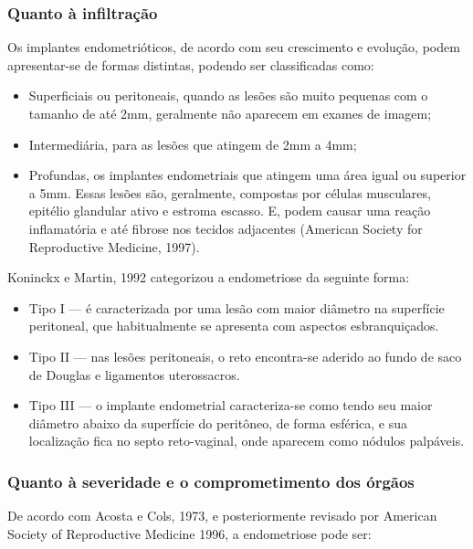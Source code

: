 \documentclass[12pt]{article} %
\begin{document}
\subsubsection{Quanto à infiltração}

Os implantes endometrióticos, de acordo com seu crescimento e evolução,
podem apresentar-se de formas distintas, podendo ser classificadas
como:
\begin{itemize}

\item Superficiais ou peritoneais, quando as lesões são muito pequenas
com o tamanho de até 2mm, geralmente não aparecem em exames de imagem;
\item Intermediária, para as lesões que atingem de 2mm a 4mm; 
\item Profundas, os implantes endometriais que atingem uma área igual ou superior a 5mm.
Essas lesões são, geralmente, compostas por células musculares,
epitélio glandular ativo e estroma escasso. E, podem causar uma reação
inflamatória e até fibrose nos tecidos adjacentes (American Society
for Reproductive Medicine, 1997).
\end{itemize}

Koninckx e Martin, 1992 categorizou a endometriose da seguinte forma:

\begin{itemize}
\item Tipo I --- é caracterizada por uma lesão com maior diâmetro na
  superfície peritoneal, que habitualmente se apresenta com aspectos
  esbranquiçados.
\item Tipo II --- nas lesões peritoneais, o reto encontra-se aderido ao
  fundo de saco de Douglas e ligamentos uterossacros.
\item Tipo III --- o implante endometrial caracteriza-se como tendo
  seu maior diâmetro abaixo da superfície do peritôneo, de forma
  esférica, e sua localização fica no septo reto-vaginal, onde
  aparecem como nódulos palpáveis.
\end{itemize}

\subsubsection{Quanto à severidade e o comprometimento dos órgãos}

De acordo com Acosta e Cols, 1973, e posteriormente revisado por American Society of Reproductive Medicine 1996, a endometriose pode ser:
\end{document}
